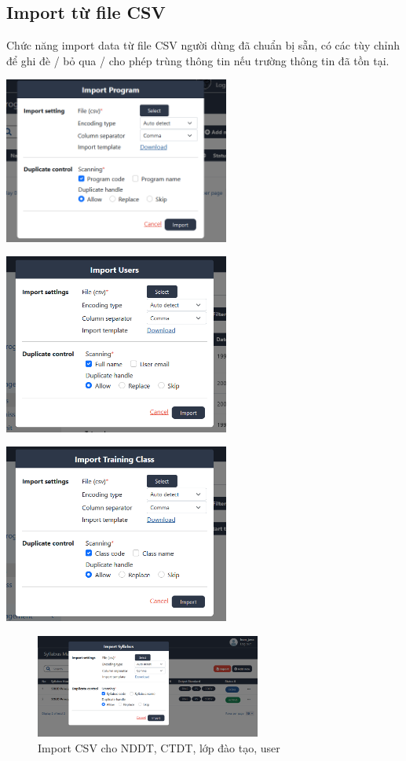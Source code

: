\documentclass[report.tex]{subfiles}
\begin{document}
\subsection{Import từ file CSV}

Chức năng import data từ file CSV người dùng đã chuẩn bị sẵn, có các tùy chỉnh 
để ghi đè / bỏ qua / cho phép trùng thông tin nếu trường thông tin đã tồn tại.

{\centering
\includegraphics[width=280px]{../meta/ui.program-import.png}
\par
}
{\centering
\includegraphics[width=280px]{../meta/ui.user-import.png}
\par
}
{\centering
\includegraphics[width=280px]{../meta/ui.class-import.png}
\par
}

\begin{figure}[!htb]
{\centering
\includegraphics[width=280px]{../meta/ui.syllabus-import.png}
\caption{Import CSV cho NDDT, CTDT, lớp đào tạo, user}
\par
}
\end{figure}
\FloatBarrier
\end{document}
